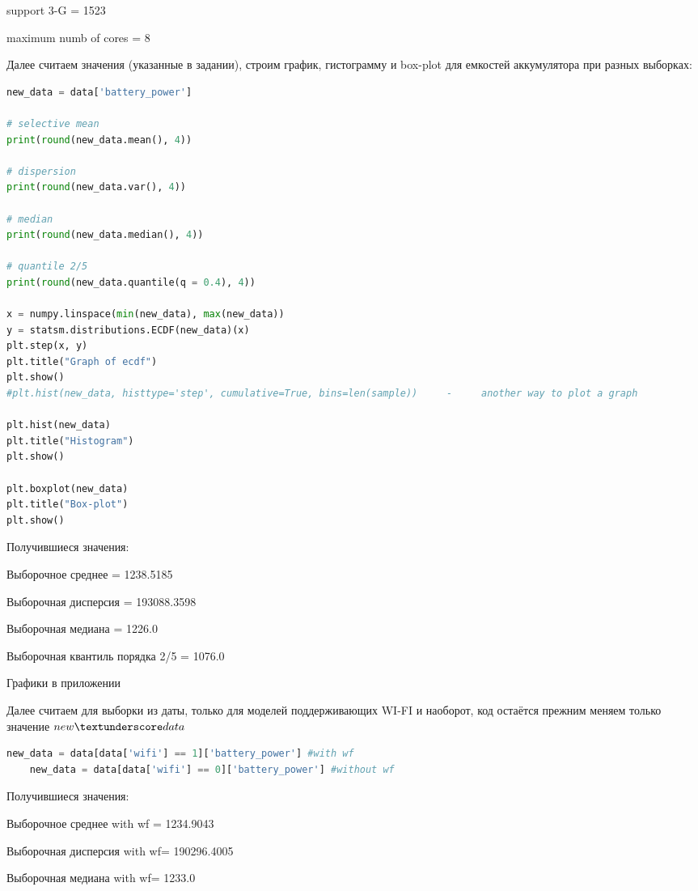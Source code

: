 \documentclass{article}
\begin{document}
support 3-G = 1523

maximum numb of cores = 8

\newpage
Далее считаем значения (указанные в задании), строим график, гистограмму и box-plot для емкостей аккумулятора при разных выборках:
\begin{lstlisting}[caption={for all data}, label={lst:label}, language=Python, mathescape=true, breaklines=true]
new_data = data['battery_power']

# selective mean
print(round(new_data.mean(), 4))

# dispersion
print(round(new_data.var(), 4))

# median
print(round(new_data.median(), 4))

# quantile 2/5
print(round(new_data.quantile(q = 0.4), 4))

x = numpy.linspace(min(new_data), max(new_data))
y = statsm.distributions.ECDF(new_data)(x)
plt.step(x, y)
plt.title("Graph of ecdf")
plt.show()
#plt.hist(new_data, histtype='step', cumulative=True, bins=len(sample))     -     another way to plot a graph

plt.hist(new_data)
plt.title("Histogram")
plt.show()

plt.boxplot(new_data)
plt.title("Box-plot")
plt.show()
\end{lstlisting}
Получившиеся значения:

Выборочное среднее = 1238.5185

Выборочная дисперсия = 193088.3598

Выборочная медиана = 1226.0

Выборочная квантиль порядка 2/5 = 1076.0

Графики в приложении
\vspace{5mm}

Далее считаем для выборки из даты, только для моделей поддерживающих WI-FI и наоборот, код остаётся прежним меняем только значение $new\textunderscore data$
\begin{lstlisting}[language=Python, mathescape=true, breaklines=true]
    new_data = data[data['wifi'] == 1]['battery_power'] #with wf
    new_data = data[data['wifi'] == 0]['battery_power'] #without wf
\end{lstlisting}

Получившиеся значения:

Выборочное среднее with wf = 1234.9043

Выборочная дисперсия with wf= 190296.4005

Выборочная медиана with wf= 1233.0
\end{document}
